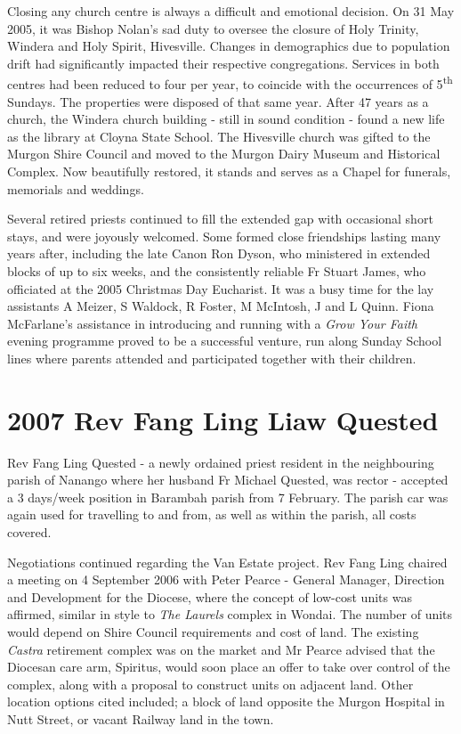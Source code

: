 Closing any church centre is always a difficult and emotional decision. On 31 May 2005, it was Bishop Nolan's sad duty to oversee the closure of Holy Trinity, Windera and Holy Spirit, Hivesville. Changes in demographics due to population drift had significantly impacted their respective congregations. Services in both centres had been reduced to four per year, to coincide with the occurrences of 5\textsuperscript{th} Sundays. The properties were disposed of that same year. After 47 years as a church, the Windera church building - still in sound condition - found a new life as the library at Cloyna State School. The Hivesville church was gifted to the Murgon Shire Council and moved to the Murgon Dairy Museum and Historical Complex. Now beautifully restored, it stands and serves as a Chapel for funerals, memorials and weddings.



Several retired priests continued to fill the extended gap with occasional short stays, and were joyously welcomed. Some formed close friendships lasting many years after, including the late Canon Ron Dyson, who ministered in extended blocks of up to six weeks, and the consistently reliable Fr Stuart James, who officiated at the 2005 Christmas Day Eucharist. It was a busy time for the lay assistants A Meizer, S Waldock, R Foster, M McIntosh, J and L Quinn. Fiona McFarlane's assistance in introducing and running with a \emph{Grow Your Faith} evening programme proved to be a successful venture, run along Sunday School lines where parents attended and participated together with their children.



\section{2007 Rev Fang Ling Liaw Quested}



Rev Fang Ling Quested - a newly ordained priest resident in the neighbouring parish of Nanango where her husband Fr Michael Quested, was rector - accepted a 3 days/week position in Barambah parish from 7 February. The parish car was again used for travelling to and from, as well as within the parish, all costs covered.



Negotiations continued regarding the Van Estate project. Rev Fang Ling chaired a meeting on 4 September 2006 with Peter Pearce - General Manager, Direction and Development for the Diocese, where the concept of low-cost units was affirmed, similar in style to \emph{The Laurels} complex in Wondai. The number of units would depend on Shire Council requirements and cost of land. The existing \emph{Castra} retirement complex was on the market and Mr Pearce advised that the Diocesan care arm, Spiritus, would soon place an offer to take over control of the complex, along with a proposal to construct units on adjacent land. Other location options cited included; a block of land opposite the Murgon Hospital in Nutt Street, or vacant Railway land in the town.



